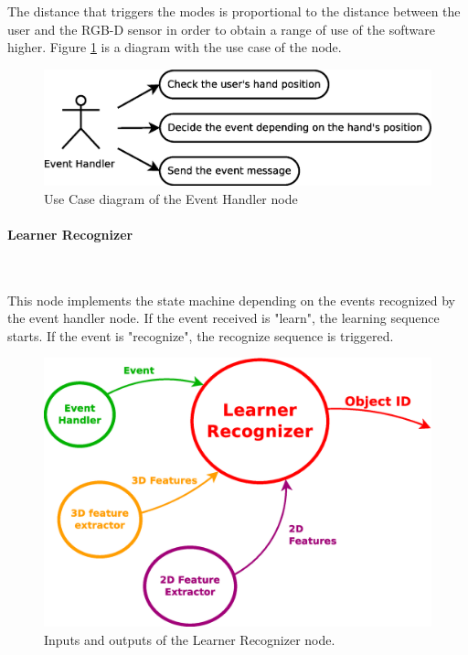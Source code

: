 	The distance that triggers the modes is proportional to the distance between the user and the RGB-D sensor in order to obtain a range of use of the software higher. 
	Figure \ref{uc_event} is a diagram with the use case of the node. 
	\begin{figure}[H]
		\centering
			\includegraphics[scale=0.4]{img/diagrams/uc_event_handler.eps}
			\caption[Use case diagram Event Handler node]{Use Case diagram of the Event Handler node}
		\label{uc_event}
	\end{figure}

\newpage

\paragraph{Learner Recognizer}\mbox{}\\
\label{learner_recognizer}

	This node implements the state machine depending on the events recognized by the event handler node. If the event received is "learn", the learning sequence starts. If the event is "recognize", the recognize sequence is triggered. 
	\\

		\begin{figure}[H]
			\begin{center}
			\includegraphics[width=0.5\linewidth]{img/diagrams/node_lr.eps}
			\caption[Learner Recognizer node I/O]{Inputs and outputs of the Learner Recognizer node.}		
			\label{node_lr}
			\end{center}
		\end{figure}

